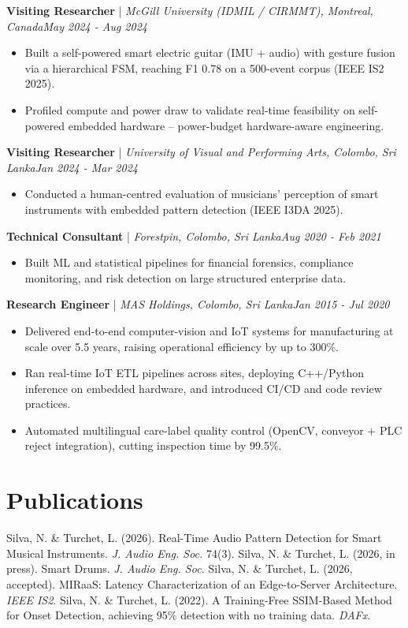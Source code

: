 \documentclass[11pt]{article}
\newenvironment{cvrole}[5]{%
  \par\noindent\textbf{\large #1} | \textit{\small #2, #3}\hfill \textit{\small #4 - #5}\par
  \begin{itemize}[leftmargin=2em, itemsep=-0.3em, topsep=-0.5em]%
}{%
  \end{itemize}\par\noindent\mbox{}\par\vspace{0.1em}%
}
\begin{document}
\begin{cvrole}{Visiting Researcher}{McGill University (IDMIL / CIRMMT)}{Montreal, Canada}{May 2024}{Aug 2024}
\item Built a self-powered smart electric guitar (IMU + audio) with gesture fusion via a hierarchical FSM, reaching F1 0.78 on a 500-event corpus (IEEE IS2 2025).
\item Profiled compute and power draw to validate real-time feasibility on self-powered embedded hardware -- power-budget hardware-aware engineering.
\end{cvrole}

\begin{cvrole}{Visiting Researcher}{University of Visual and Performing Arts}{Colombo, Sri Lanka}{Jan 2024}{Mar 2024}
\item Conducted a human-centred evaluation of musicians' perception of smart instruments with embedded pattern detection (IEEE I3DA 2025).
\end{cvrole}

\begin{cvrole}{Technical Consultant}{Forestpin}{Colombo, Sri Lanka}{Aug 2020}{Feb 2021}
\item Built ML and statistical pipelines for financial forensics, compliance monitoring, and risk detection on large structured enterprise data.
\end{cvrole}

\begin{cvrole}{Research Engineer}{MAS Holdings}{Colombo, Sri Lanka}{Jan 2015}{Jul 2020}
\item Delivered end-to-end computer-vision and IoT systems for manufacturing at scale over 5.5 years, raising operational efficiency by up to 300\%.
\item Ran real-time IoT ETL pipelines across sites, deploying C++/Python inference on embedded hardware, and introduced CI/CD and code review practices.
\item Automated multilingual care-label quality control (OpenCV, conveyor + PLC reject integration), cutting inspection time by 99.5\%.
\end{cvrole}

\section*{Publications}
Silva, N. \& Turchet, L. (2026). Real-Time Audio Pattern Detection for Smart Musical Instruments. \textit{J. Audio Eng. Soc.} 74(3). Silva, N. \& Turchet, L. (2026, in press). Smart Drums. \textit{J. Audio Eng. Soc.} Silva, N. \& Turchet, L. (2026, accepted). MIRaaS: Latency Characterization of an Edge-to-Server Architecture. \textit{IEEE IS2}. Silva, N. \& Turchet, L. (2022). A Training-Free SSIM-Based Method for Onset Detection, achieving 95\% detection with no training data. \textit{DAFx}.
\end{document}
